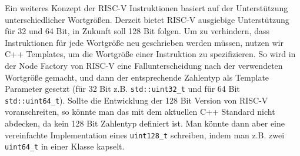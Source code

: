 Ein weiteres Konzept der RISC-V Instruktionen basiert auf der Unterstützung
unterschiedlicher Wortgrößen. Derzeit bietet RISC-V ausgiebige Unterstützung für
32 und 64 Bit, in Zukunft soll 128 Bit folgen. Um zu verhindern, dass Instruktionen
für jede Wortgröße neu geschrieben werden müssen, nutzen wir C++ Templates, um
die Wortgröße einer Instruktion zu spezifizieren. So wird in der Node Factory
von RISC-V eine Fallunterscheidung nach der verwendeten Wortgröße gemacht, und
dann der entsprechende Zahlentyp als Template Parameter gesetzt (für 32 Bit
z.B. \texttt{std::uint32\_t} und für 64 Bit \texttt{std::uint64\_t}). Sollte die
Entwicklung der 128 Bit Version von RISC-V voranschreiten, so könnte man das mit
dem aktuellen C++ Standard nicht abdecken, da kein 128 Bit Zahlentyp definiert
ist. Man könnte dann aber eine vereinfachte Implementation eines \texttt{uint128\_t}
schreiben, indem man z.B. zwei \texttt{uint64\_t} in einer Klasse kapselt.
